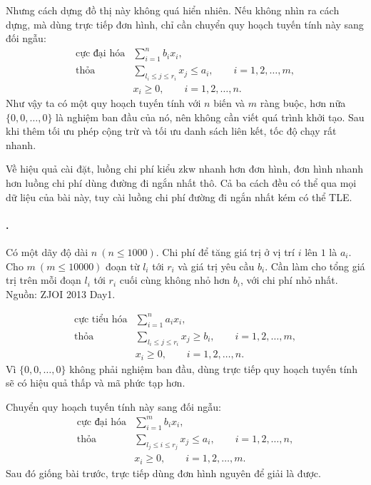 \documentclass[11pt]{article}
\begin{document}
Nhưng cách dựng đồ thị này không quá hiển nhiên. Nếu không nhìn ra cách dựng,
mà dùng trực tiếp đơn hình, chỉ cần chuyển quy hoạch tuyến tính này sang đối
ngẫu:
\[
\begin{array}{ll}
\text{cực đại hóa} & \displaystyle \sum_{i=1}^{n}b_ix_i,\\[0.4em]
\text{thỏa} & \displaystyle \sum_{l_i\le j\le r_i}x_j\le a_i,
  \qquad i=1,2,\ldots,m,\\[0.4em]
& x_i\ge 0,\qquad i=1,2,\ldots,n.
\end{array}
\]
Như vậy ta có một quy hoạch tuyến tính với \(n\) biến và \(m\) ràng buộc, hơn
nữa \(\{0,0,\ldots,0\}\) là nghiệm ban đầu của nó, nên không cần viết quá
trình khởi tạo. Sau khi thêm tối ưu phép cộng trừ và tối ưu danh sách liên
kết, tốc độ chạy rất nhanh.

Về hiệu quả cài đặt, luồng chi phí kiểu zkw nhanh hơn đơn hình, đơn hình nhanh
hơn luồng chi phí dùng đường đi ngắn nhất thô. Cả ba cách đều có thể qua mọi
dữ liệu của bài này, tuy cài luồng chi phí đường đi ngắn nhất kém có thể TLE.

\paragraph{.}
Có một dãy độ dài \(n\ (n\le 1000)\). Chi phí để tăng giá trị ở vị trí \(i\)
lên \(1\) là \(a_i\). Cho \(m\ (m\le 10000)\) đoạn từ \(l_i\) tới \(r_i\) và
giá trị yêu cầu \(b_i\). Cần làm cho tổng giá trị trên mỗi đoạn \(l_i\) tới
\(r_i\) cuối cùng không nhỏ hơn \(b_i\), với chi phí nhỏ nhất. Nguồn: ZJOI
2013 Day1.

\[
\begin{array}{ll}
\text{cực tiểu hóa} & \displaystyle \sum_{i=1}^{n}a_ix_i,\\[0.4em]
\text{thỏa} & \displaystyle \sum_{l_i\le j\le r_i}x_j\ge b_i,
  \qquad i=1,2,\ldots,m,\\[0.4em]
& x_i\ge 0,\qquad i=1,2,\ldots,n.
\end{array}
\]
Vì \(\{0,0,\ldots,0\}\) không phải nghiệm ban đầu, dùng trực tiếp quy hoạch
tuyến tính sẽ có hiệu quả thấp và mã phức tạp hơn.

Chuyển quy hoạch tuyến tính này sang đối ngẫu:
\[
\begin{array}{ll}
\text{cực đại hóa} & \displaystyle \sum_{i=1}^{m}b_ix_i,\\[0.4em]
\text{thỏa} & \displaystyle \sum_{l_j\le i\le r_j}x_j\le a_i,
  \qquad i=1,2,\ldots,n,\\[0.4em]
& x_i\ge 0,\qquad i=1,2,\ldots,m.
\end{array}
\]
Sau đó giống bài trước, trực tiếp dùng đơn hình nguyên để giải là được.
\end{document}
